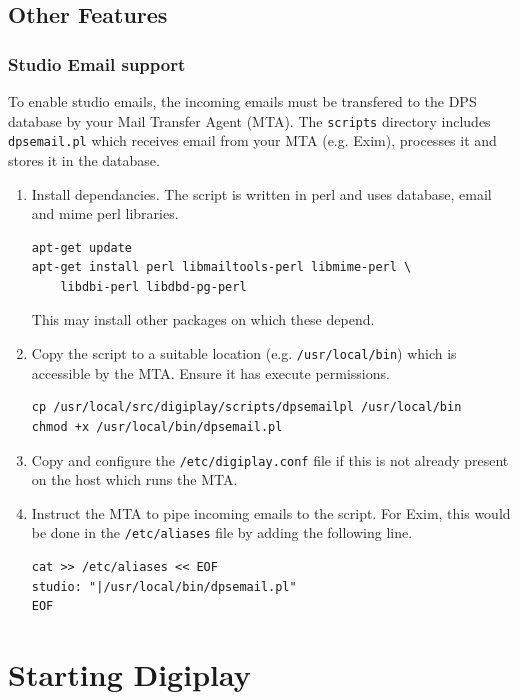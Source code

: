\documentclass[a4paper,12pt]{report}
\numberwithin{equation}{section}
\begin{document}
\section{Other Features}
\subsection{Studio Email support}
To enable studio emails, the incoming emails must be transfered to the DPS database by your Mail Transfer Agent (MTA). The \texttt{scripts} directory includes \texttt{dpsemail.pl} which receives email from your MTA (e.g. Exim), processes it and stores it in the database.
\begin{enumerate}
\item Install dependancies. The script is written in perl and uses database, email and mime perl libraries.
\begin{lstlisting}
apt-get update
apt-get install perl libmailtools-perl libmime-perl \
    libdbi-perl libdbd-pg-perl
\end{lstlisting}
This may install other packages on which these depend.
\item Copy the script to a suitable location (e.g. \texttt{/usr/local/bin}) which is accessible by the MTA. Ensure it has execute permissions. 
\begin{lstlisting}
cp /usr/local/src/digiplay/scripts/dpsemailpl /usr/local/bin
chmod +x /usr/local/bin/dpsemail.pl
\end{lstlisting}
\item Copy and configure the \texttt{/etc/digiplay.conf} file if this is not already present on the host which runs the MTA.
\item Instruct the MTA to pipe incoming emails to the script. For Exim, this would be done in the \texttt{/etc/aliases} file by adding the following line.
\begin{lstlisting}
cat >> /etc/aliases << EOF
studio: "|/usr/local/bin/dpsemail.pl"
EOF
\end{lstlisting}
\end{enumerate}

\chapter{Starting Digiplay}
\end{document}
